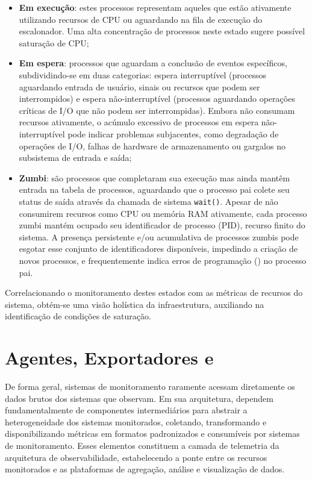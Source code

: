 \begin{itemize}
    \item {\textbf{Em execução}}: estes processos representam aqueles que estão ativamente utilizando recursos de CPU ou aguardando na fila de execução do escalonador. Uma alta concentração de processos neste estado sugere possível saturação de CPU;
    \item {\textbf{Em espera}}: processos que aguardam a conclusão de eventos específicos, subdividindo-se em duas categorias: espera interruptível (processos aguardando entrada de usuário, sinais ou recursos que podem ser interrompidos) e espera não-interruptível (processos aguardando operações críticas de I/O que não podem ser interrompidas). Embora não consumam recursos ativamente, o acúmulo excessivo de processos em espera não-interruptível pode indicar problemas subjacentes, como degradação de operações de I/O, falhas de hardware de armazenamento ou gargalos no subsistema de entrada e saída;
    \item {\textbf{Zumbi}}: são processos que completaram sua execução mas ainda mantêm entrada na tabela de processos, aguardando que o processo pai colete seu status de saída através da chamada de sistema \verb|wait()|. Apesar de não consumirem recursos como CPU ou memória RAM ativamente, cada processo zumbi mantém ocupado seu identificador de processo (PID), recurso finito do sistema. A presença persistente e/ou acumulativa de processos zumbis pode esgotar esse conjunto de identificadores disponíveis, impedindo a criação de novos processos, e frequentemente indica erros de programação () no processo pai.
\end{itemize}

Correlacionando o monitoramento destes estados com as métricas de recursos do sistema, obtém-se uma visão holística da infraestrutura, auxiliando na identificação de condições de saturação.

\section{Agentes, Exportadores e }
\label{section:Agentes}

De forma geral, sistemas de monitoramento raramente acessam diretamente os dados brutos dos sistemas que observam. Em sua arquitetura, dependem fundamentalmente de componentes intermediários para abstrair a heterogeneidade dos sistemas monitorados, coletando, transformando e disponibilizando métricas em formatos padronizados e consumíveis por sistemas de monitoramento. Esses elementos constituem a camada de telemetria da arquitetura de observabilidade, estabelecendo a ponte entre os recursos monitorados e as plataformas de agregação, análise e visualização de dados.


